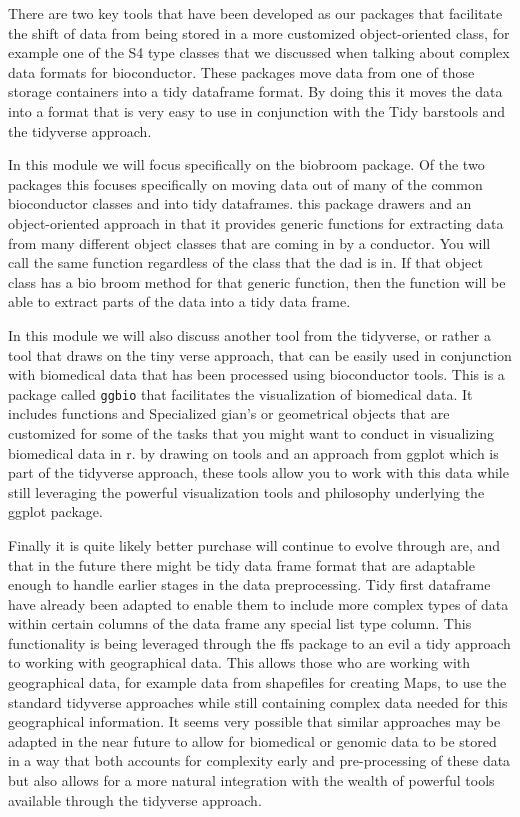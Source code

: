 \documentclass[]{tufte-book}
\begin{document}
There are two key tools that have been developed as our packages that facilitate the shift of data from being stored in a more customized object-oriented class, for example one of the S4 type classes that we discussed when talking about complex data formats for bioconductor. These packages move data from one of those storage containers into a tidy dataframe format. By doing this it moves the data into a format that is very easy to use in conjunction with the Tidy barstools and the tidyverse approach.

In this module we will focus specifically on the biobroom package. Of the two
packages this focuses specifically on moving data out of many of the common
bioconductor classes and into tidy dataframes. this package drawers and an
object-oriented approach in that it provides generic functions for extracting
data from many different object classes that are coming in by a conductor. You
will call the same function regardless of the class that the dad is in. If that
object class has a bio broom method for that generic function, then the function
will be able to extract parts of the data into a tidy data frame.

In this module we will also discuss another tool from the tidyverse, or rather a
tool that draws on the tiny verse approach, that can be easily used in
conjunction with biomedical data that has been processed using bioconductor
tools. This is a package called \texttt{ggbio} that facilitates the visualization of
biomedical data. It includes functions and Specialized gian's or geometrical
objects that are customized for some of the tasks that you might want to conduct
in visualizing biomedical data in r. by drawing on tools and an approach from
ggplot which is part of the tidyverse approach, these tools allow you to work
with this data while still leveraging the powerful visualization tools and
philosophy underlying the ggplot package.

Finally it is quite likely better purchase will continue to evolve through are,
and that in the future there might be tidy data frame format that are adaptable
enough to handle earlier stages in the data preprocessing. Tidy first dataframe
have already been adapted to enable them to include more complex types of data
within certain columns of the data frame any special list type column. This
functionality is being leveraged through the ffs package to an evil a tidy
approach to working with geographical data. This allows those who are working
with geographical data, for example data from shapefiles for creating Maps, to
use the standard tidyverse approaches while still containing complex data needed
for this geographical information. It seems very possible that similar
approaches may be adapted in the near future to allow for biomedical or genomic
data to be stored in a way that both accounts for complexity early and
pre-processing of these data but also allows for a more natural integration with
the wealth of powerful tools available through the tidyverse approach.
\end{document}
